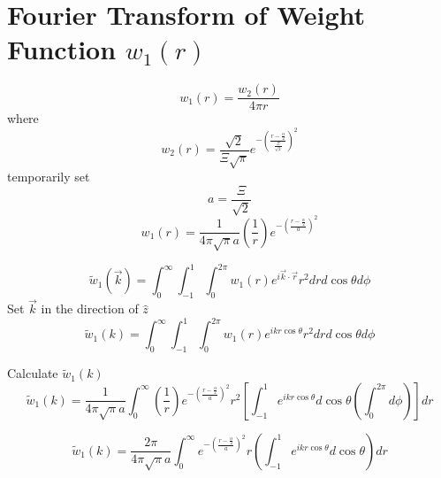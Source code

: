 \documentclass[double,12pt]{beavtex}
\begin{document}
\section{Fourier Transform of Weight Function $w_{1}(r)$}
\begin{equation}{w_1(r)=\frac{w_2(r)}{4{\pi}r}}\end{equation}
where
\begin{equation}{w_2(r)=\frac{\sqrt{2}}{\Xi\sqrt{\pi}}e^{-\left(\frac{r-\frac{\alpha}{2}}{\frac{\Xi}{\sqrt{2}}}\right)^2}}\end{equation}
temporarily set 
\begin{equation}{a=\frac{\Xi}{\sqrt{2}}}\end{equation}
\begin{equation}{w_1(r)=\frac{1}{4{\pi}\sqrt{\pi}a}\left(\frac{1}{r}\right)e^{-\left(\frac{r-\frac{\alpha}{2}}{a}\right)^2}}\end{equation}

\begin{equation}{\widetilde{w}_1(\vec{k})=\int_{0}^{\infty}\int_{-1}^{1}\int_{0}^{2\pi}w_1(r)e^{i\vec{k}\cdot{\vec{r}}}r^2d{r}d{\cos\theta}d{\phi}}\end{equation}
Set $\vec{k}$ in the direction of $\hat{z}$ 
\begin{equation}{\widetilde{w}_1(k)=\int_{0}^{\infty}\int_{-1}^{1}\int_{0}^{2\pi}w_1(r)e^{ikr\cos\theta}r^2d{r}d{\cos\theta}d{\phi}}\end{equation}

\noindent Calculate $\widetilde{w}_1(k)$ 
\begin{equation}{\widetilde{w}_1(k)=\frac{1}{4{\pi}\sqrt{\pi}a}\int_{0}^{\infty}\left(\frac{1}{r}\right)e^{-\left(\frac{r-\frac{\alpha}{2}}{a}\right)^2}r^2\left[\int_{-1}^{1}e^{ikr\cos\theta}d{\cos\theta}\left(\int_{0}^{2\pi}d{\phi}\right)\right]d{r}}\end{equation}

\begin{equation}{\widetilde{w}_1(k)=\frac{2\pi}{4{\pi}\sqrt{\pi}a}\int_{0}^{\infty}e^{-\left(\frac{r-\frac{\alpha}{2}}{a}\right)^2}r\left(\int_{-1}^{1}e^{ikr\cos\theta}d{\cos\theta}\right)d{r}}\end{equation}
\end{document}
